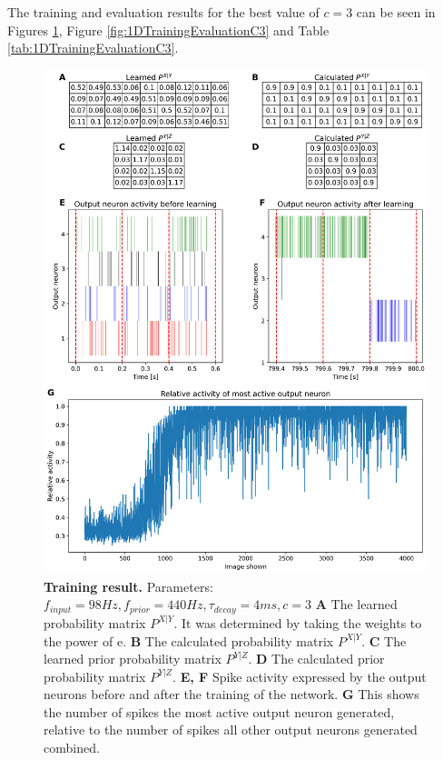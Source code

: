 The training and evaluation results for the best value of $c = 3$ can be seen in Figures \ref{fig:1DTrainingC3}, Figure \ref{fig:1DTrainingEvaluationC3} and Table \ref{tab:1DTrainingEvaluationC3}.
\begin{figure}
  \includegraphics[width=\linewidth * 0.8]{figures/1D/training/trainingPlot_98_440_4_c3.png}
  \caption{\textbf{Training result.} Parameters: $f_{input} = 98 Hz, f_{prior} = 440 Hz, \tau_{decay} = 4 ms, c = 3$  \textbf{A} The learned probability matrix $P^{X|Y}$. It was determined by taking the weights to the power of e. \textbf{B} The calculated probability matrix $P^{X|Y}$. \textbf{C} The learned prior probability matrix $P^{Y|Z}$. \textbf{D} The calculated prior probability matrix $P^{Y|Z}$.
 \textbf{E, F} Spike activity expressed by the output neurons before and after the training of the network. \textbf{G} This shows the number of spikes the most active output neuron generated, relative to the number of spikes all other output neurons generated combined.}
  \label{fig:1DTrainingC3}
\end{figure}

